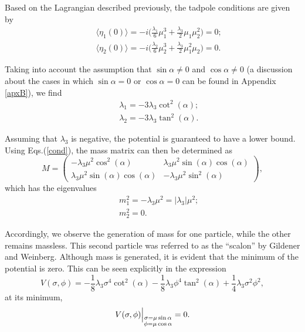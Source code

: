 \documentclass[11pt,a4paper,english,superscriptaddress,preprint,aps,prd]{revtex4}
\begin{document}
Based on the Lagrangian described previously, the tadpole conditions are given by
\begin{subequations}\label{tadpoles}  \begin{eqnarray}   &&\langle\eta_1(0)\rangle=-i\Bigr(\frac{\lambda_1}{6}\mu_1^3+\frac{\lambda_3}{2}\mu_1\mu_2^2\Bigr)=0; \\   &&\langle\eta_2(0)\rangle=-i\Bigr(\frac{\lambda_2}{6}\mu_2^3+\frac{\lambda_3}{2}\mu_1^2\mu_2\Bigr)=0.  \end{eqnarray} \end{subequations}

Taking into account the assumption that $\sin\alpha \neq 0$ and $\cos \alpha\neq0$ (a discussion about the cases in which $\sin\alpha = 0$ or $\cos\alpha = 0$ can be found in Appendix \ref{apxB}), we find
\begin{subequations}\label{cond}  \begin{eqnarray}   &&\lambda_1 = -3 \lambda_3 \cot ^2(\alpha );\\   &&\lambda_2 = -3 \lambda_3 \tan ^2(\alpha ).  \end{eqnarray} \end{subequations}

Assuming that $\lambda_3$ is negative, the potential is guaranteed to have a lower bound. Using Eqs.(\ref{cond}), the mass matrix can then be determined as
\begin{equation}
 M = \begin{pmatrix}
  -\lambda_3 \mu ^2 \cos ^2(\alpha ) & \lambda_3 \mu ^2 \sin (\alpha ) \cos (\alpha )\\ 
  \lambda_3 \mu ^2 \sin (\alpha ) \cos (\alpha ) & -\lambda_3 \mu ^2 \sin ^2(\alpha )
\end{pmatrix},
\end{equation}
which has the eigenvalues
\begin{subequations}
 \begin{eqnarray}
  &&m_1^2 = -\lambda_3\mu^2=|\lambda_3|\mu^2;\\
  &&m_2^2 = 0.
 \end{eqnarray}
\end{subequations}

Accordingly, we observe the generation of mass for one particle, while the other remains massless. This second particle was referred to as the ``scalon'' by Gildener and Weinberg. Although mass is generated, it is evident that the minimum of the potential is zero. This can be seen explicitly in the expression
\begin{equation}
V(\sigma,\phi) = -\frac{1}{8} \lambda_3 \sigma ^4 \cot ^2(\alpha )-\frac{1}{8} \lambda_3 \phi ^4 \tan ^2(\alpha )+\frac{1}{4} \lambda_3 \sigma ^2 \phi ^2,
\end{equation}
at its minimum,
\begin{equation}
V(\sigma,\phi)\Bigr{|}_{\substack{\sigma=\mu\sin\alpha\\\phi=\mu\cos\alpha}} = 0.
\end{equation}
\end{document}
